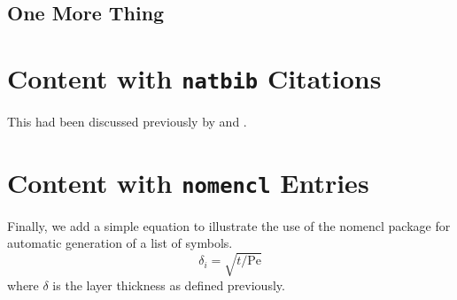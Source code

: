 \subsection{One More Thing}
\lipsum[22-25]

\section{Content with \texttt{natbib} Citations}

This had been discussed previously by \citep{winkle.1991} and
\citet{bullwinkle.1990}. \lipsum[22-25]


\section{Content with \texttt{nomencl} Entries}

Finally, we add a simple equation to illustrate the use of the nomencl
 package for automatic generation of a list of symbols.
\begin{equation}
\delta_i = \sqrt{t/\mathrm{Pe}}
\end{equation}
where $\delta$ is the layer
thickness %
%
%
%
as defined previously. \lipsum[26-30]

\endinput
